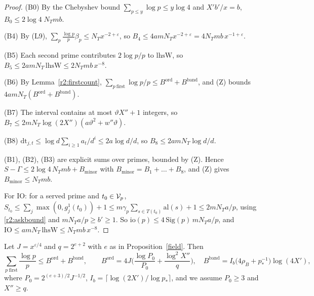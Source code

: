 \begin{proof}
(B0) By the Chebyshev bound $\sum_{p\le y}\log p\le y\log4$ and $X'b'/x=b$, $B_0\le2\log4\;N_Tmb$.

(B4) By (L9), $\sum_p\frac{\log p}p\beta_p\le N_Tx^{-2+\varepsilon}$, so $B_4\le4amN_Tx^{-2+\varepsilon}=4N_Tmb\,x^{-1+\varepsilon}$.

(B5) Each second prime contributes $2\log p/p$ to $\mathrm{lhsW}$, so $B_5\le2amN_T\,\mathrm{lhsW}\le2N_Tmb\,x^{-8}$.

(B6) By Lemma~\ref{r2:firstcount}, $\sum_{p\ \mathrm{first}}\log p/p\le B^{\mathrm{ord}}+B^{\mathrm{band}}$, and (Z) bounds $4amN_T(B^{\mathrm{ord}}+B^{\mathrm{band}})$.

(B7) The interval contains at most $\vartheta X''+1$ integers, so $B_7\le2mN_T\log(2X'')(a\vartheta^2+w''\vartheta)$.

(B8) $\mathrm{dt}_{j,t}\le\log d\sum_{i\ge1}a_t/d^i\le2a\log d/d$, so $B_8\le2amN_T\log d/d$.

(B1), (B2), (B3) are explicit sums over primes, bounded by (Z). Hence $S-\Gamma\le2\log4\,N_Tmb+B_{\mathrm{minor}}$ with $B_{\mathrm{minor}}=B_1+\dots+B_8$, and (Z) gives $B_{\mathrm{minor}}\le N_Tmb$.

For $\mathrm{IO}$: for a served prime and $t_0\in\mathcal V_p$, $S_{t_0}\le\sum_j\max(0,g^1_j(t_0))+1\le m\gamma_p\sum_{s\in T(t_0)}\mathrm{al}(s)+1\le2mN_Ta/p$, using \eqref{r2:askbound} and $mN_Ta/p\ge b'\ge1$. So $\mathrm{io}(p)\le4\,\mathrm{Sig}(p)\,mN_Ta/p$, and $\mathrm{IO}\le amN_T\,\mathrm{lhsW}\le N_Tmb\,x^{-8}$.
\end{proof}

\begin{lemma}\label{r2:firstcount}
Let $J=x^{\varepsilon/4}$ and $q=2^{e+2}$ with $e$ as in Proposition~\ref{field}. Then
\[
\sum_{p\ \mathrm{first}}\frac{\log p}p\le B^{\mathrm{ord}}+B^{\mathrm{band}},\qquad B^{\mathrm{ord}}=4J\Big(\frac{\log P_0}{P_0}+\frac{\log^2X''}q\Big),\quad B^{\mathrm{band}}=I_b\big(4\rho_B+p_*^{-1}\big)\log(4X'),
\]
where $P_0=2^{(e+3)/2}J^{-1/2}$, $I_b=\lceil\log(2X')/\log p_*\rceil$, and we assume $P_0\ge3$ and $X''\ge q$.
\end{lemma}

